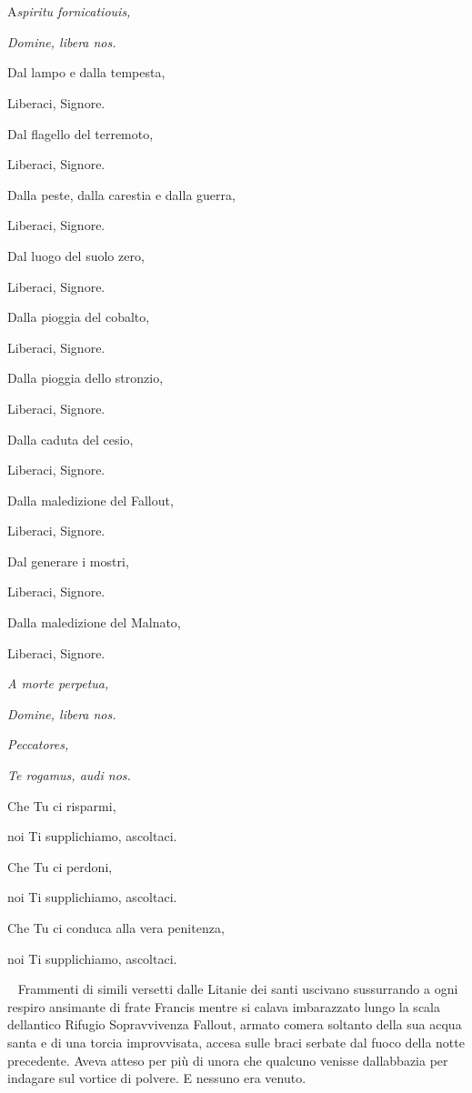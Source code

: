 	\chapter{\phantom{title}}

\lettrine{A}{}\emph{spiritu fornicatiouis,}

\emph{Domine, libera nos.}

Dal lampo e dalla tempesta,

Liberaci, Signore.

Dal flagello del terremoto,

Liberaci, Signore.

Dalla peste, dalla carestia e dalla guerra,

Liberaci, Signore.

Dal luogo del suolo zero,

Liberaci, Signore.

Dalla pioggia del cobalto,

Liberaci, Signore.

Dalla pioggia dello stronzio,

Liberaci, Signore.

Dalla caduta del cesio,

Liberaci, Signore.

Dalla maledizione del Fallout,

Liberaci, Signore.

Dal generare i mostri,

Liberaci, Signore.

Dalla maledizione del Malnato,

Liberaci, Signore.

\emph{A morte perpetua,}

\emph{Domine, libera nos.}

\emph{Peccatores,}

\emph{Te rogamus, audi nos.}

Che Tu ci risparmi,

noi Ti supplichiamo, ascoltaci.

Che Tu ci perdoni,

noi Ti supplichiamo, ascoltaci.

Che Tu ci conduca alla vera penitenza,

noi Ti supplichiamo, ascoltaci.

~
Frammenti di simili versetti dalle Litanie dei santi uscivano
sussurrando a ogni respiro ansimante di frate Francis mentre si calava
imbarazzato lungo la scala dell\textquotesingle antico Rifugio
Sopravvivenza Fallout, armato com\textquotesingle era soltanto della sua
acqua santa e di una torcia improvvisata, accesa sulle braci serbate dal
fuoco della notte precedente. Aveva atteso per più di
un\textquotesingle ora che qualcuno venisse dall\textquotesingle abbazia
per indagare sul vortice di polvere. E nessuno era venuto.

